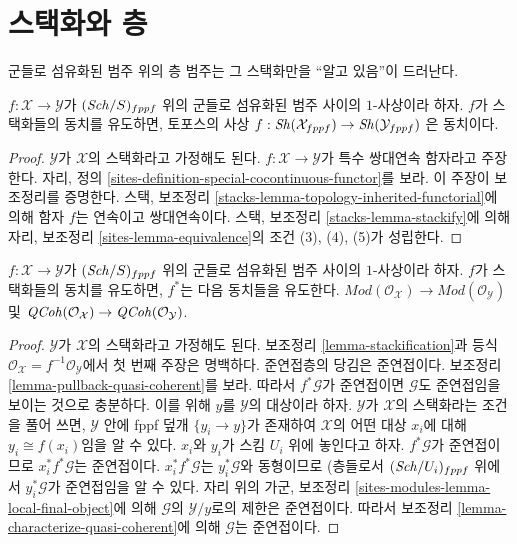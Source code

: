 \section{스택화와 층}
\label{section-stackification}

\noindent
군들로 섬유화된 범주 위의 층 범주는 그 스택화만을
``알고 있음''이 드러난다.

\begin{lemma}
\label{lemma-stackification}
$f : \mathcal{X} \to \mathcal{Y}$가 $(\mathit{Sch}/S)_{fppf}$ 위의
군들로 섬유화된 범주 사이의 $1$-사상이라 하자.
$f$가 스택화들의 동치를 유도하면, 토포스의 사상
$f : \mathop{\mathit{Sh}}\nolimits(\mathcal{X}_{fppf}) \to \mathop{\mathit{Sh}}\nolimits(\mathcal{Y}_{fppf})$
은 동치이다.
\end{lemma}

\begin{proof}
$\mathcal{Y}$가 $\mathcal{X}$의 스택화라고 가정해도 된다.
$f : \mathcal{X} \to \mathcal{Y}$가 특수 쌍대연속 함자라고
주장한다. 자리, 정의
\ref{sites-definition-special-cocontinuous-functor}를 보라.
이 주장이 보조정리를 증명한다. 스택, 보조정리
\ref{stacks-lemma-topology-inherited-functorial}에 의해 함자 $f$는
연속이고 쌍대연속이다. 스택, 보조정리
\ref{stacks-lemma-stackify}에 의해 자리, 보조정리
\ref{sites-lemma-equivalence}의 조건 (3), (4), (5)가 성립한다.
\end{proof}

\begin{lemma}
\label{lemma-stackification-quasi-coherent}
$f : \mathcal{X} \to \mathcal{Y}$가 $(\mathit{Sch}/S)_{fppf}$ 위의
군들로 섬유화된 범주 사이의 $1$-사상이라 하자.
$f$가 스택화들의 동치를 유도하면, $f^*$는 다음 동치들을 유도한다.
$\textit{Mod}(\mathcal{O}_\mathcal{X}) \to
\textit{Mod}(\mathcal{O}_\mathcal{Y})$
및
$\mathit{QCoh}(\mathcal{O}_\mathcal{X}) \to
\mathit{QCoh}(\mathcal{O}_\mathcal{Y})$.
\end{lemma}

\begin{proof}
$\mathcal{Y}$가 $\mathcal{X}$의 스택화라고 가정해도 된다.
보조정리 \ref{lemma-stackification}과 등식
$\mathcal{O}_\mathcal{X} = f^{-1}\mathcal{O}_\mathcal{Y}$에서
첫 번째 주장은 명백하다. 준연접층의 당김은 준연접이다.
보조정리 \ref{lemma-pullback-quasi-coherent}를 보라.
따라서 $f^*\mathcal{G}$가 준연접이면 $\mathcal{G}$도 준연접임을
보이는 것으로 충분하다.
이를 위해 $y$를 $\mathcal{Y}$의 대상이라 하자.
$\mathcal{Y}$가 $\mathcal{X}$의 스택화라는 조건을 풀어 쓰면,
$\mathcal{Y}$ 안에 fppf 덮개 $\{y_i \to y\}$가 존재하여
$\mathcal{X}$의 어떤 대상
$x_i$에 대해 $y_i \cong f(x_i)$임을 알 수 있다.
$x_i$와 $y_i$가 스킴 $U_i$ 위에 놓인다고 하자.
$f^*\mathcal{G}$가 준연접이므로 $x_i^*f^*\mathcal{G}$는 준연접이다.
$x_i^*f^*\mathcal{G}$는 $y_i^*\mathcal{G}$와 동형이므로
(층들로서
$(\mathit{Sch}/U_i)_{fppf}$ 위에서 $y_i^*\mathcal{G}$가 준연접임을 알 수 있다.
자리 위의 가군, 보조정리
\ref{sites-modules-lemma-local-final-object}에 의해
$\mathcal{G}$의 $\mathcal{Y}/y$로의 제한은 준연접이다.
따라서 보조정리 \ref{lemma-characterize-quasi-coherent}에 의해
$\mathcal{G}$는 준연접이다.
\end{proof}





